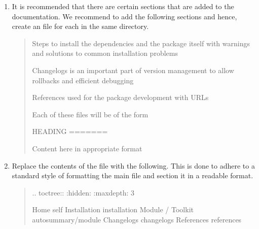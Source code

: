\documentclass[letterpaper,10pt,english]{sphinxmanual}
\begin{document}
\begin{enumerate}
\item {} 
\sphinxAtStartPar
It is recommended that there are certain sections that are added to the documentation.
We recommend to add the following sections and hence, create an  file for each in the same  directory.
\begin{quote}
\begin{description}
\sphinxAtStartPar
Steps to install the dependencies and the package itself with warnings and solutions to common installation problems

\sphinxAtStartPar
Changelogs is an important part of version management to allow rollbacks and efficient debugging

\sphinxAtStartPar
References used for the package development with URLs

\end{description}

\sphinxAtStartPar
Each of these files will be of the form

\begin{sphinxVerbatim}[commandchars=\\\{\}]
HEADING
=======

Content here in appropriate format
\end{sphinxVerbatim}
\end{quote}

\item {} 
\sphinxAtStartPar
Replace the contents of the  file with the following.
This is done to adhere to a standard style of formatting the main file and section it in a readable format.
\begin{quote}

\begin{sphinxVerbatim}[commandchars=\\\{\}]
.. toctree::
    :hidden:
    :maxdepth: 3

    Home \PYGZlt{}self\PYGZgt{}
    Installation \PYGZlt{}installation\PYGZgt{}
    Module / Toolkit \PYGZlt{}\PYGZus{}autosummary/module\PYGZgt{}
    Changelogs \PYGZlt{}changelogs\PYGZgt{}
    References \PYGZlt{}references\PYGZgt{}


\end{sphinxVerbatim}
\end{quote}
\end{enumerate}
\end{document}
